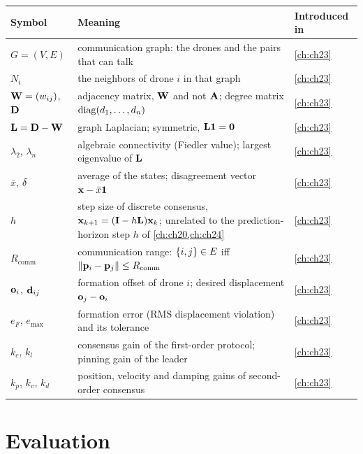 {\small\renewcommand{\arraystretch}{1.0}%
\noindent\begin{tabularx}{\textwidth}{@{}lYl@{}}
\toprule
\textbf{Symbol} & \textbf{Meaning} & \textbf{Introduced in}\\
\midrule
$G=(V,E)$ & communication graph: the drones and the pairs that can talk & \cref{ch:ch23}\\
$N_i$ & the neighbors of drone $i$ in that graph & \cref{ch:ch23}\\
$\mathbf{W}=(w_{ij})$, $\mathbf{D}$ & adjacency matrix, $\mathbf{W}$ and not $\mathbf{A}$; degree matrix $\operatorname{diag}(d_1,\dots,d_n)$ & \cref{ch:ch23}\\
$\mathbf{L}=\mathbf{D}-\mathbf{W}$ & graph Laplacian; symmetric, $\mathbf{L}\mathbf{1}=\mathbf{0}$ & \cref{ch:ch23}\\
$\lambda_2$, $\lambda_n$ & algebraic connectivity (Fiedler value); largest eigenvalue of $\mathbf{L}$ & \cref{ch:ch23}\\
$\bar{x}$, $\mathbf{\delta}$ & average of the states; disagreement vector $\mathbf{x}-\bar{x}\mathbf{1}$ & \cref{ch:ch23}\\
$h$ & step size of discrete consensus, $\mathbf{x}_{k+1}=(\mathbf{I}-h\mathbf{L})\mathbf{x}_k$; unrelated to the prediction-horizon step $h$ of \cref{ch:ch20,ch:ch24} & \cref{ch:ch23}\\
$R_{\mathrm{comm}}$ & communication range: $\left\{ i,j \right\}\in E$ iff $\left\lVert \mathbf{p}_i-\mathbf{p}_j \right\rVert\le R_{\mathrm{comm}}$ & \cref{ch:ch23}\\
$\mathbf{o}_i$, $\mathbf{d}_{ij}$ & formation offset of drone $i$; desired displacement $\mathbf{o}_j-\mathbf{o}_i$ & \cref{ch:ch23}\\
$e_F$, $e_{\max}$ & formation error (RMS displacement violation) and its tolerance & \cref{ch:ch23}\\
$k_c$, $k_l$ & consensus gain of the first-order protocol; pinning gain of the leader & \cref{ch:ch23}\\
$k_p$, $k_v$, $k_d$ & position, velocity and damping gains of second-order consensus & \cref{ch:ch23}\\
\bottomrule
\end{tabularx}\par}


\section*{Evaluation}


